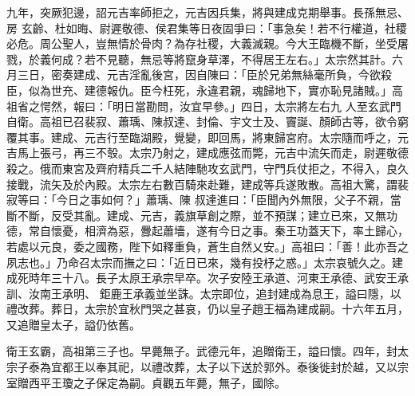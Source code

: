 \begin{pinyinscope}
 九年，突厥犯邊，詔元吉率師拒之，元吉因兵集，將與建成克期舉事。長孫無忌、房
 玄齡、杜如晦、尉遲敬德、侯君集等日夜固爭曰：「事急矣！若不行權道，社稷必危。周公聖人，豈無情於骨肉？為存社稷，大義滅親。今大王臨機不斷，坐受屠戮，於義何成？若不見聽，無忌等將竄身草澤，不得居王左右。」太宗然其計。六月三日，密奏建成、元吉淫亂後宮，因自陳曰：「臣於兄弟無絲毫所負，今欲殺臣，似為世充、建德報仇。臣今枉死，永違君親，魂歸地下，實亦恥見諸賊。」高祖省之愕然，報曰：「明日當勘問，汝宜早參。」四日，太宗將左右九
 人至玄武門自衛。高祖已召裴寂、蕭瑀、陳叔達、封倫、宇文士及、竇誕、顏師古等，欲令窮覆其事。建成、元吉行至臨湖殿，覺變，即回馬，將東歸宮府。太宗隨而呼之，元吉馬上張弓，再三不彀。太宗乃射之，建成應弦而斃，元吉中流矢而走，尉遲敬德殺之。俄而東宮及齊府精兵二千人結陣馳攻玄武門，守門兵仗拒之，不得入，良久接戰，流矢及於內殿。太宗左右數百騎來赴難，建成等兵遂敗散。高祖大驚，謂裴寂等曰：「今日之事如何？」蕭瑀、陳
 叔達進曰：「臣聞內外無限，父子不親，當斷不斷，反受其亂。建成、元吉，義旗草創之際，並不預謀；建立已來，又無功德，常自懷憂，相濟為惡，釁起蕭墻，遂有今日之事。秦王功蓋天下，率土歸心，若處以元良，委之國務，陛下如釋重負，蒼生自然乂安。」高祖曰：「善！此亦吾之夙志也。」乃命召太宗而撫之曰：「近日已來，幾有投杼之惑。」太宗哀號久之。建成死時年三十八。長子太原王承宗早卒。次子安陸王承道、河東王承德、武安王承訓、汝南王承明、
 鉅鹿王承義並坐誅。太宗即位，追封建成為息王，謚曰隱，以禮改葬。葬日，太宗於宜秋門哭之甚哀，仍以皇子趙王福為建成嗣。十六年五月，又追贈皇太子，謚仍依舊。



 衛王玄霸，高祖第三子也。早薨無子。武德元年，追贈衛王，謚曰懷。四年，封太宗子泰為宜都王以奉其祀，以禮改葬，太子以下送於郭外。泰後徙封於越，又以宗室贈西平王瓊之子保定為嗣。貞觀五年薨，無子，國除。




\end{pinyinscope}
